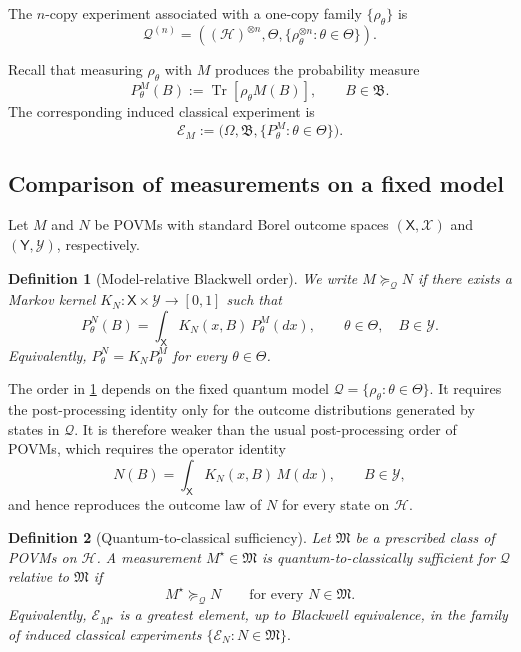 \documentclass{article}
\newtheorem{definition}{Definition}
\theoremstyle{named}
\theoremstyle{named1}
\newcommand{\Tr}{\operatorname{Tr}}
\newcommand{\cE}{\mathcal{E}}
\newcommand{\cQ}{\mathcal Q}
\newcommand{\cH}{\mathcal H}
\theoremstyle{plain}
\theoremstyle{remark}
\begin{document}
The $n$-copy experiment associated with a one-copy family $\{\rho_\theta\}$ is
\[
    \cQ^{(n)}
    =\left((\cH)^{\otimes n},\Theta,
    \{\rho_\theta^{\otimes n}:\theta\in\Theta\}\right).
\]


Recall that measuring $\rho_\theta$ with $M$ produces the probability measure
\[
    P_\theta^M(B):=\Tr[\rho_\theta M(B)],\qquad B\in\mathfrak B.
\]
The corresponding induced classical experiment is
\[
    \cE_M:=\bigl(\Omega,\mathfrak B,\{P_\theta^M:\theta\in\Theta\}\bigr).
\]

\subsection{Comparison of measurements on a fixed model}
\label{subsec:model-relative-comparison}

Let $M$ and $N$ be POVMs with standard Borel outcome spaces
$(\mathsf X,\mathcal X)$ and $(\mathsf Y,\mathcal Y)$, respectively.

\begin{definition}[Model-relative Blackwell order]
\label{def:model-relative-order}
We write $M\succeq_{\cQ}N$ if there exists a Markov kernel
$K_N:\mathsf X\times\mathcal Y\to[0,1]$ such that
\[
    P_\theta^N(B)
    =
    \int_{\mathsf X}K_N(x,B)\,P_\theta^M(dx),
    \qquad
    \theta\in\Theta,\quad B\in\mathcal Y.
\]
Equivalently, $P_\theta^N=K_NP_\theta^M$ for every $\theta\in\Theta$.
\end{definition}

The order in \cref{def:model-relative-order} depends on the fixed quantum
model $\cQ=\{\rho_\theta:\theta\in\Theta\}$. It requires the
post-processing identity only for the outcome distributions generated by
states in $\cQ$. It is therefore weaker than the usual post-processing order
of POVMs, which requires the operator identity
\[
    N(B)
    =
    \int_{\mathsf X}K_N(x,B)\,M(dx),
    \qquad B\in\mathcal Y,
\]
and hence reproduces the outcome law of $N$ for every state on $\cH$.

\begin{definition}[Quantum-to-classical sufficiency]
\label{def:q2c-sufficiency}
Let $\mathfrak M$ be a prescribed class of POVMs on $\cH$. A measurement
$M^\star\in\mathfrak M$ is \emph{quantum-to-classically sufficient} for
$\cQ$ relative to $\mathfrak M$ if
\[
    M^\star\succeq_{\cQ}N
    \qquad\text{for every }N\in\mathfrak M.
\]
Equivalently, $\cE_{M^\star}$ is a greatest element, up to Blackwell
equivalence, in the family of induced classical experiments
$
    \{\cE_N:N\in\mathfrak M\}.
$
\end{definition}
\end{document}
